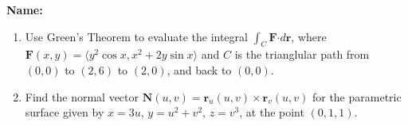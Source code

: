 \documentclass[12pt]{article}
\newcommand{\F}{\mathbf{F}}
\renewcommand{\r}{\mathbf{r}}
\newcommand{\dotp}{\boldsymbol{\cdot}}
\begin{document}
{\bf \Large Name:}
\thispagestyle{fancy}

\bigskip

\begin{enumerate}

 \item Use Green's Theorem to evaluate the integral $\int_C\F\dotp d\r$, where  \\$\F(x,y) = \langle y^2\cos x, x^2+2y\sin x\rangle$ and $C$ is the trianglular path from $(0,0)$ to $(2,6)$ to $(2,0)$, and back to $(0,0)$.


\vspace{3.5in}

 \item Find the normal vector $\mathbf{N}(u,v) = \r_u(u,v)\times\r_v(u,v)$ for the parametric surface given by $x=3u$, $y=u^2+v^2$, $z=v^3$, at the point $(0,1,1)$.
\end{enumerate}
\end{document}
